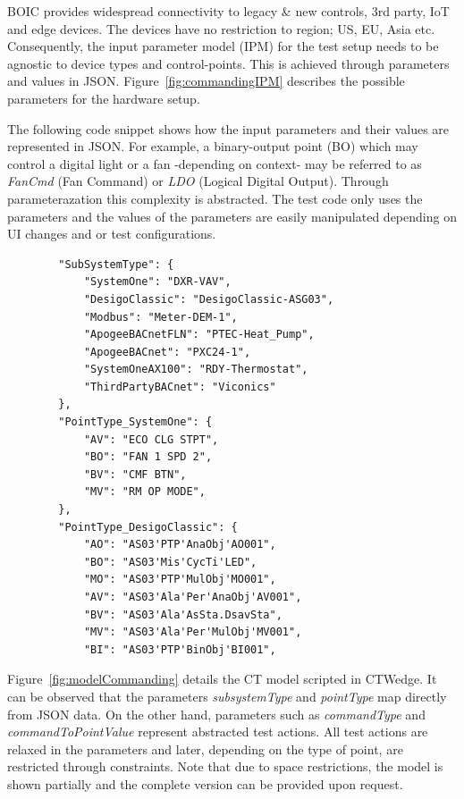 \documentclass[conference]{IEEEtran}
\begin{document}
	BOIC provides widespread connectivity to legacy \& new controls, 3rd party, IoT and edge devices. The devices have no restriction to region; US, EU, Asia etc. 
	Consequently, the input parameter model (IPM) for the test setup needs to be agnostic to device types and control-points. This is achieved through parameters and values in JSON.
	Figure~\ref{fig:commandingIPM} describes the possible parameters for the hardware setup.

	The following code snippet shows how the input parameters and their values are represented in JSON. 
	For example, a binary-output point (BO) which may control a digital light or a fan -depending on context- may be referred to as \textit{FanCmd} (Fan Command) or \textit{LDO} (Logical Digital Output).
  Through parameterazation this complexity is abstracted. The test code only uses the parameters and the values of the parameters are easily manipulated depending on UI changes and or test configurations.

	\begin{lstlisting}
		"SubSystemType": {
			"SystemOne": "DXR-VAV",
			"DesigoClassic": "DesigoClassic-ASG03",
			"Modbus": "Meter-DEM-1",
			"ApogeeBACnetFLN": "PTEC-Heat_Pump",
			"ApogeeBACnet": "PXC24-1",
			"SystemOneAX100": "RDY-Thermostat",
			"ThirdPartyBACnet": "Viconics"
		},
		"PointType_SystemOne": {
			"AV": "ECO CLG STPT",
			"BO": "FAN 1 SPD 2",
			"BV": "CMF BTN",
			"MV": "RM OP MODE",
		},
		"PointType_DesigoClassic": {
			"AO": "AS03'PTP'AnaObj'AO001",
			"BO": "AS03'Mis'CycTi'LED",
			"MO": "AS03'PTP'MulObj'MO001",
			"AV": "AS03'Ala'Per'AnaObj'AV001",
			"BV": "AS03'Ala'AsSta.DsavSta",
			"MV": "AS03'Ala'Per'MulObj'MV001",
			"BI": "AS03'PTP'BinObj'BI001",	
	\end{lstlisting}

	
	Figure~\ref{fig:modelCommanding} details the CT model scripted in CTWedge.
	It can be observed that the parameters \textit{subsystemType} and \textit{pointType} map directly from JSON data.
	On the other hand, parameters such as \textit{commandType} and \textit{commandToPointValue} represent abstracted test actions.
	All test actions are relaxed in the parameters and later, depending on the type of point, are restricted through constraints.
	Note that due to space restrictions, the model is shown partially and the complete version can be provided upon request.
	
\end{document}
